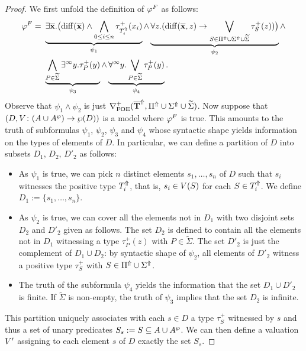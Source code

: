 \begin{proof}
We first unfold the definition of $\varphi^{\f}$ as follows:
\begin{align*}
\varphi^{\f} =\ &
\underbrace{
    \exists \vlist{x}.\big(\arediff{\vlist{x}} \land \bigwedge_{0 \leq i \leq n} \tau^+_{\lift{T}_i}(x_i)
}_{\psi_1}
\land \underbrace{
    \forall z.(\arediff{\vlist{x},z} \lthen \bigvee_{S\in \lift{\Pi} \cup \lift{\Sigma} \cup \widetilde{\Sigma}} \tau^+_S(z))\big)
}_{\psi_2}
\land
\\ & \underbrace{
    \bigwedge_{P\in\widetilde{\Sigma}} \qu y.{\tau}^{+}_P(y)
}_{\psi_3} \land
 \underbrace{
    \dqu y.\bigvee_{P\in\widetilde{\Sigma}} {\tau}^{+}_P(y)
}_{\psi_4} .
\end{align*}
Observe that $\psi_1 \land \psi_2$ is just $\mondbnfofoe{\lift{\vlist{T}}}{\lift{\Pi} \cup \lift{\Sigma} \cup \widetilde{\Sigma}}{+}$. Now suppose that $(D,\val \: (A \cup \shA ) \to \wp(D))$ is a model where $\varphi^{\f}$ is true. This amounts to the truth of subformulas $\psi_1$, $\psi_2$, $\psi_3$ and $\psi_4$ whose syntactic shape yields information on the types of elements of $D$. In particular, we can define a partition of $D$ into subsets $D_1$, $D_2$, $D'_2$ as follows:
\begin{itemize}
  \item As $\psi_1$ is true, we can pick $n$ distinct elements $s_1,\dots,s_n$ of $D$ such that $s_i$ witnesses the positive type $\lift{T}_i$, %
   that is, $s_i \in \val(S)$ for each $S \in \lift{T}_i$. We define $D_1 := \{s_1,\dots,s_n\}$.
  \item  As $\psi_2$ is true, we can cover all the elements not in $D_1$ with two disjoint sets $D_2$ and $D'_2$ given as follows. The set $D_2$ is defined to contain all the elements not in $D_1$ witnessing a type ${\tau}^{+}_P(z)$ with $P \in \widetilde{\Sigma}$. The set $D'_2$ is just the complement of $D_1 \cup D_2$: by syntactic shape of $\psi_2$, all elements of $D'_2$ witness a positive type ${\tau}^{+}_S$ with
  $S \in \lift{\Pi} \cup \lift{\Sigma}$.
  \item The truth of the subformula $\psi_4$ yields the information that the set $D_1 \cup D'_2$ is finite. If $\widetilde{\Sigma}$ is non-empty, the truth of $\psi_3$ implies that the set $D_2$ is infinite.
 \end{itemize}
This partition uniquely associates with each $s \in D$ a type ${\tau}^{+}_S$ witnessed by $s$ and thus a set of unary predicates $S_s := S \subseteq A \cup \shA$. We can then define a valuation $\val'$ assigning to each element $s$ of $D$ exactly the set $S_s$.


\end{proof}
